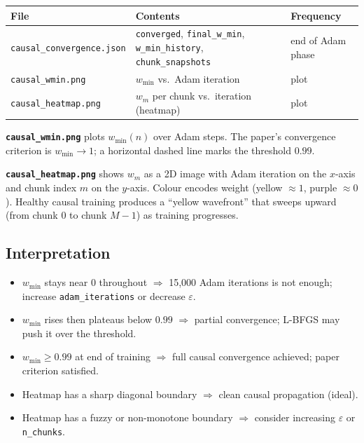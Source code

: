 \documentclass[11pt, a4paper]{article}
\newcommand{\file}[1]{\texttt{#1}}
\begin{document}
\begin{center}
\begin{tabular}{lll}
\toprule
\textbf{File} & \textbf{Contents} & \textbf{Frequency} \\
\midrule
\file{causal\_convergence.json} & \texttt{converged}, \texttt{final\_w\_min},
  \texttt{w\_min\_history}, \texttt{chunk\_snapshots} & end of Adam phase \\
\file{causal\_wmin.png} & $w_{\min}$ vs.\ Adam iteration & plot \\
\file{causal\_heatmap.png} & $w_m$ per chunk vs.\ iteration (heatmap) & plot \\
\bottomrule
\end{tabular}
\end{center}

\textbf{\file{causal\_wmin.png}} plots $w_{\min}(n)$ over Adam steps.
The paper's convergence criterion is $w_{\min} \to 1$; a horizontal dashed
line marks the threshold $0.99$.

\textbf{\file{causal\_heatmap.png}} shows $w_m$ as a 2D image with
Adam iteration on the $x$-axis and chunk index $m$ on the $y$-axis.
Colour encodes weight (yellow $\approx 1$, purple $\approx 0$). Healthy
causal training produces a ``yellow wavefront'' that sweeps upward (from
chunk 0 to chunk $M-1$) as training progresses.

\subsection{Interpretation}

\begin{itemize}
  \item $w_{\min}$ stays near $0$ throughout $\Rightarrow$
        15{,}000 Adam iterations is not enough; increase
        \texttt{adam\_iterations} or decrease $\varepsilon$.
  \item $w_{\min}$ rises then plateaus below $0.99$ $\Rightarrow$
        partial convergence; L-BFGS may push it over the threshold.
  \item $w_{\min} \geq 0.99$ at end of training $\Rightarrow$
        full causal convergence achieved; paper criterion satisfied.
  \item Heatmap has a sharp diagonal boundary $\Rightarrow$
        clean causal propagation (ideal).
  \item Heatmap has a fuzzy or non-monotone boundary $\Rightarrow$
        consider increasing $\varepsilon$ or \texttt{n\_chunks}.
\end{itemize}
\end{document}
